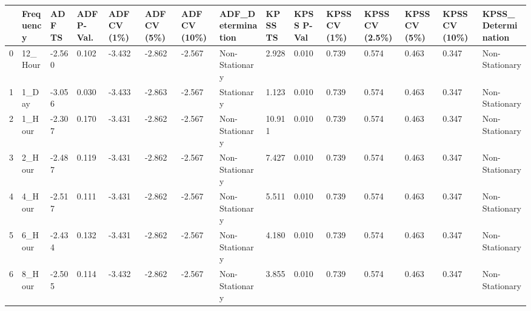 \begin{tabular}{lllllllllllllll}
\toprule
 & Frequency & ADF TS & ADF P-Val. & ADF CV (1\%) & ADF CV (5\%) & ADF CV (10\%) & ADF_Determination & KPSS TS & KPSS P-Val & KPSS CV (1\%) & KPSS CV (2.5\%) & KPSS CV (5\%) & KPSS CV (10\%) & KPSS_Determination \\
\midrule
0 & 12_Hour & -2.560 & 0.102 & -3.432 & -2.862 & -2.567 & Non-Stationary & 2.928 & 0.010 & 0.739 & 0.574 & 0.463 & 0.347 & Non-Stationary \\
1 & 1_Day & -3.056 & 0.030 & -3.433 & -2.863 & -2.567 & Stationary & 1.123 & 0.010 & 0.739 & 0.574 & 0.463 & 0.347 & Non-Stationary \\
2 & 1_Hour & -2.307 & 0.170 & -3.431 & -2.862 & -2.567 & Non-Stationary & 10.911 & 0.010 & 0.739 & 0.574 & 0.463 & 0.347 & Non-Stationary \\
3 & 2_Hour & -2.487 & 0.119 & -3.431 & -2.862 & -2.567 & Non-Stationary & 7.427 & 0.010 & 0.739 & 0.574 & 0.463 & 0.347 & Non-Stationary \\
4 & 4_Hour & -2.517 & 0.111 & -3.431 & -2.862 & -2.567 & Non-Stationary & 5.511 & 0.010 & 0.739 & 0.574 & 0.463 & 0.347 & Non-Stationary \\
5 & 6_Hour & -2.434 & 0.132 & -3.431 & -2.862 & -2.567 & Non-Stationary & 4.180 & 0.010 & 0.739 & 0.574 & 0.463 & 0.347 & Non-Stationary \\
6 & 8_Hour & -2.505 & 0.114 & -3.432 & -2.862 & -2.567 & Non-Stationary & 3.855 & 0.010 & 0.739 & 0.574 & 0.463 & 0.347 & Non-Stationary \\
\bottomrule
\end{tabular}
